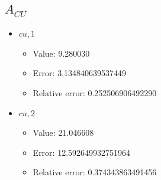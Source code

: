 \documentclass{article}%
\begin{document}
\subsection{$A_{CU}$}%
\begin{itemize}%
	\item $\textit{cu},1$%
	\begin{itemize}%
		\item Value: 9.280030%
		\item Error: 3.134840639537449%
		\item Relative error: 0.252506906492290%
	\end{itemize}%
	\item $\textit{cu},2$%
	\begin{itemize}%
		\item Value: 21.046608%
		\item Error: 12.592649932751964%
		\item Relative error: 0.374343863491456%
	\end{itemize}%
\end{itemize}%
\end{document}
